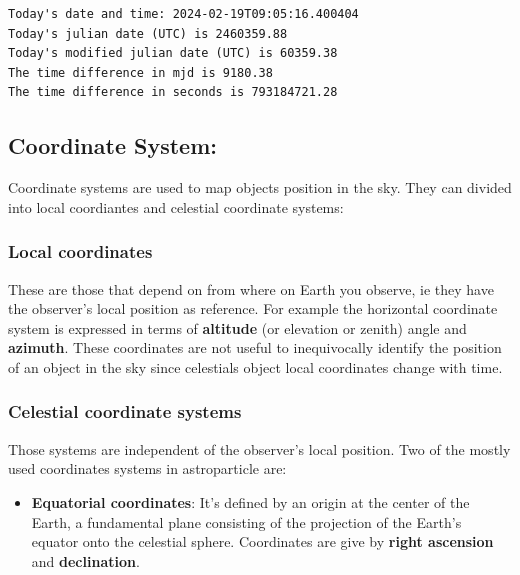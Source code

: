 \documentclass[
  letterpaper,
  DIV=11,
  numbers=noendperiod]{scrreprt}
\providecommand{\tightlist}{%
  \setlength{\itemsep}{0pt}\setlength{\parskip}{0pt}}\usepackage{longtable,booktabs,array}
\begin{document}
\begin{verbatim}
Today's date and time: 2024-02-19T09:05:16.400404
Today's julian date (UTC) is 2460359.88
Today's modified julian date (UTC) is 60359.38
The time difference in mjd is 9180.38
The time difference in seconds is 793184721.28
\end{verbatim}

\subsection*{Coordinate System:}\label{coordinate-system}

Coordinate systems are used to map objects position in the sky. They can
divided into local coordiantes and celestial coordinate systems:

\subsubsection*{Local coordinates}\label{local-coordinates}

These are those that depend on from where on Earth you observe, ie they
have the observer's local position as reference. For example the
horizontal coordinate system is expressed in terms of \textbf{altitude}
(or elevation or zenith) angle and \textbf{azimuth}. These coordinates
are not useful to inequivocally identify the position of an object in
the sky since celestials object local coordinates change with time.

\subsubsection*{Celestial coordinate
systems}\label{celestial-coordinate-systems}

Those systems are independent of the observer's local position. Two of
the mostly used coordinates systems in astroparticle are:

\begin{itemize}
\tightlist
\item
  \textbf{Equatorial coordinates}: It's defined by an origin at the
  center of the Earth, a fundamental plane consisting of the projection
  of the Earth's equator onto the celestial sphere. Coordinates are give
  by \textbf{right ascension} and \textbf{declination}.
\end{itemize}
\end{document}

